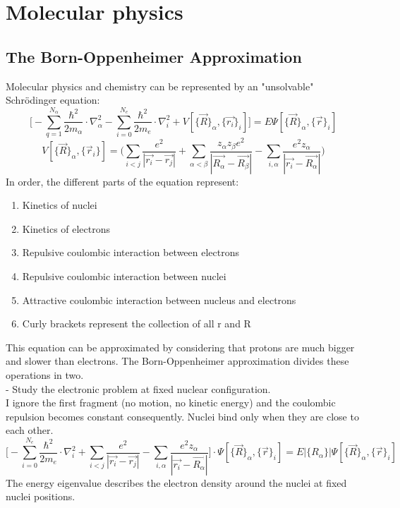 \graphicspath{{chapters/07/}}
\chapter{Molecular physics}
\section{The Born-Oppenheimer Approximation}
Molecular physics and chemistry can be represented by an "unsolvable" Schr\"odinger equation:\\
\[
\bigg[-\sum_{q=1}^{N_{\alpha}}\frac{\hbar^2}{2m_{\alpha}}\cdot\nabla_{\alpha}^2
-\sum_{i=0}^{N_e}\frac{\hbar^2}{2m_e}\cdot\nabla^2_i
+V[\{\vec{R}\}_{\alpha},\{\vec{r_i}\}_i]\bigg]=E\Psi[\{\vec{R}\}_{\alpha},\{\vec{r}\}_i]
\]
\[
V[\{\vec{R}\}_{\alpha},\{\vec{r}_i\}]=\bigg(\sum_{i<j}\frac{e^2}{|\vec{r_i}-\vec{r_j}|}
+\sum_{\alpha<\beta}\frac{z_{\alpha}z_{\beta}e^2}{|\vec{R_{\alpha}}-\vec{R_{\beta}}|}
-\sum_{i,\alpha}\frac{e^2z_{\alpha}}{|\vec{r_i}-\vec{R_{\alpha}}|}\bigg)\]
In order, the different parts of the equation represent:
\begin{enumerate}
	\item Kinetics of nuclei
	\item Kinetics of electrons
	\item Repulsive coulombic interaction between electrons
	\item Repulsive coulombic interaction between nuclei
	\item Attractive coulombic interaction between nucleus and electrons
	\item Curly brackets represent the collection of all r and R
\end{enumerate}
This equation can be approximated by considering that protons are much bigger and slower than electrons. The Born-Oppenheimer approximation divides these operations in two.\\
 - Study the electronic problem at fixed nuclear configuration.\\
I ignore the first fragment (no motion, no kinetic energy) and the coulombic repulsion becomes constant consequently. Nuclei bind only when they are close to each other.
\[
\bigg[-\sum_{i=0}^{N_e}\frac{\hbar^2}{2m_e}\cdot\nabla^2_i
+\sum_{i<j}\frac{e^2}{|\vec{r_i}-\vec{r_j}|}
-\sum_{i,\alpha}\frac{e^2z_{\alpha}}{|\vec{r_i}-\vec{R_{\alpha}}|}\bigg]\cdot\Psi[\{\vec{R}\}_{\alpha},\{\vec{r}\}_i] =E|\{R_{\alpha}\}|\Psi[\{\vec{R}\}_{\alpha},\{\vec{r}\}_i]
\]
The energy eigenvalue describes the electron density around the nuclei at fixed nuclei positions.\\
